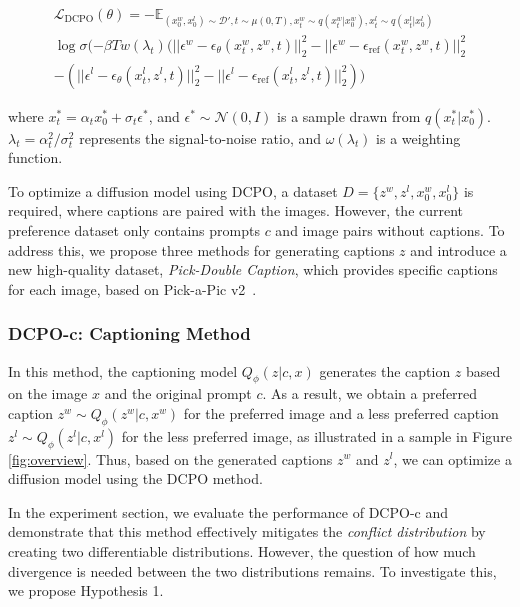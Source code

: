 \begin{equation}
\begin{split}
    \mathcal{L}_\text{DCPO}(\theta) = -\mathit{\mathbb{E}}_{(x^{w}_0, x^{l}_0) \sim \mathcal{D'}, t\sim \mu (0,T), x^{w}_t \sim q(x^{w}_t | x^{w}_0), x^{l}_t \sim q(x^{l}_t | x^{l}_0)} \\
    \log \sigma (-\beta T w (\lambda_t) 
    (||\epsilon^w - \epsilon_\theta (x^{w}_t, z^w, t)||^{2}_{2} - || \epsilon^w - \epsilon_\text{ref}(x^{w}_t, z^w, t)||^{2}_2 \\
    - (|| \epsilon^l - \epsilon_\theta (x^{l}_t,z^l,t) ||^{2}_2 - || \epsilon^l - \epsilon_\text{ref}(x^{l}_t,z^l, t)||^{2}_2 ))
\end{split}
\end{equation}

where \( x_t^* = \alpha_t x_0^* + \sigma_t \epsilon^* \), and \( \epsilon^* \sim \mathcal{N}(0, I) \) is a sample drawn from \( q(x_t^* | x_0^*) \). \( \lambda_t = \alpha_t^2 / \sigma_t^2 \) represents the signal-to-noise ratio, and \( \omega(\lambda_t) \) is a weighting function.


To optimize a diffusion model using DCPO, a dataset \( D = \{z^w, z^l, x_0^w, x_0^l\} \) is required, where captions are paired with the images. However, the current preference dataset only contains prompts \( c \) and image pairs without captions. To address this, we propose three methods for generating captions \( z \) and introduce a new high-quality dataset, \textit{Pick-Double Caption}, which provides specific captions for each image, based on Pick-a-Pic v2~\citep{kirstain2023pickapic}.


\subsubsection{DCPO-c: Captioning Method}
\label{sec:dcpo-c}
In this method, the captioning model \( Q_{\phi}(z|c, x) \) generates the caption \( z \) based on the image \( x \) and the original prompt \( c \). As a result, we obtain a preferred caption \( z^w \sim Q_{\phi}(z^w|c, x^w) \) for the preferred image and a less preferred caption \( z^l \sim Q_{\phi}(z^l|c, x^l) \) for the less preferred image, as illustrated in a sample in Figure \ref{fig:overview}. Thus, based on the generated captions \( z^w \) and \( z^l \), we can optimize a diffusion model using the DCPO method.


In the experiment section, we evaluate the performance of DCPO-c and demonstrate that this method effectively mitigates the \textit{conflict distribution} by creating two differentiable distributions. However, the question of how much divergence is needed between the two distributions remains. To investigate this, we propose Hypothesis 1.

